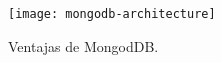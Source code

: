 \begin{figure}[h]
    \centering
    \texttt{[image: mongodb-architecture]}
    \caption{ Ventajas de MongodDB. }
    \label{fig:mongoDBarquitectura}
\end{figure}




    



    
 




